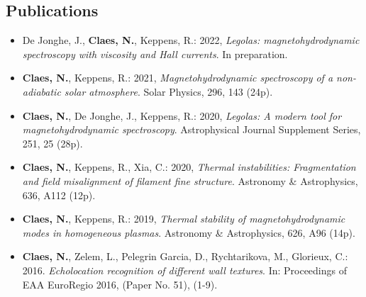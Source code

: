 \subsection*{Publications}
\begin{itemize}
  \item[] De Jonghe, J., \textbf{Claes, N.}, Keppens, R.: 2022,
  \emph{Legolas: magnetohydrodynamic spectroscopy with viscosity and Hall currents}.
  In preparation.

  \item[] \textbf{Claes, N.}, Keppens, R.: 2021,
  \emph{Magnetohydrodynamic spectroscopy of a non-adiabatic solar atmosphere}.
  Solar Physics, 296, 143 (24p).

  \item[] \textbf{Claes, N.}, De Jonghe, J., Keppens, R.: 2020,
  \emph{Legolas: A modern tool for magnetohydrodynamic spectroscopy}.
  Astrophysical Journal Supplement Series, 251, 25 (28p).

  \item[] \textbf{Claes, N.}, Keppens, R., Xia, C.: 2020,
  \emph{Thermal instabilities: Fragmentation and field misalignment of filament fine structure}.
  Astronomy \& Astrophysics, 636, A112 (12p).

  \item[] \textbf{Claes, N.}, Keppens, R.: 2019,
  \emph{Thermal stability of magnetohydrodynamic modes in homogeneous plasmas}.
  Astronomy \& Astrophysics, 626, A96 (14p).

  \item[] \textbf{Claes, N.}, Zelem, L., Pelegrin Garcia, D., Rychtarikova, M., Glorieux, C.: 2016.
  \emph{Echolocation recognition of different wall textures}.
  In: Proceedings of EAA EuroRegio 2016, (Paper No. 51), (1-9).
\end{itemize}

